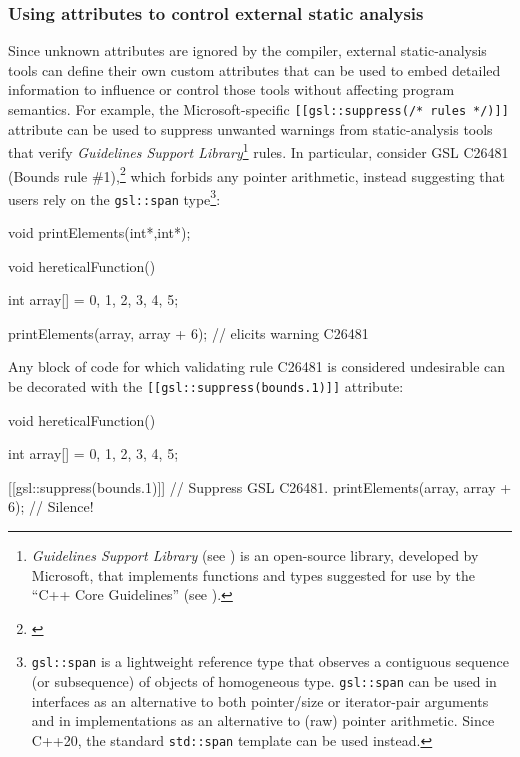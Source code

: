 \subsubsection[Using attributes to control external static analysis]{Using attributes to control external static analysis}\label{using-attributes-to-control-external-static-analysis}

Since unknown attributes are ignored by the compiler, external
static-analysis tools can define their own custom attributes that can be
used to embed detailed information to influence or control those tools
without affecting program semantics. For example, the Microsoft-specific
\lstinline![[gsl::suppress(/*!~\lstinline!rules!~\lstinline!*/)]]! attribute can
be used to suppress unwanted warnings from static-analysis tools that
verify \emph{Guidelines Support Library}{\cprotect\footnote{\emph{Guidelines
Support Library} (see \cite{microsoft}) is an open-source library, developed by Microsoft,
that implements functions and types suggested for use by the ``C++
  Core Guidelines'' (see \cite{stroustrup20}).}}
rules. In particular, consider GSL C26481 (Bounds rule \#1),\footnote{\cite{microsoftC26481}} which forbids any pointer arithmetic, instead
suggesting that users rely on the \lstinline!gsl::span!
type{\cprotect\footnote{\lstinline!gsl::span! is a lightweight reference
type that observes a contiguous sequence (or subsequence) of objects
of homogeneous type. \lstinline!gsl::span! can be used in interfaces as
an alternative to both pointer/size or iterator-pair arguments and in
implementations as an alternative to (raw) pointer arithmetic. Since
  C++20, the standard \lstinline!std::span! template can be used instead.}}:

\begin{emcppshiddenlisting}[emcppsbatch={e9,e10}]
void printElements(int*,int*);
\end{emcppshiddenlisting}
\begin{emcppslisting}[emcppsbatch=e9]
void hereticalFunction()
{
    int array[] = {0, 1, 2, 3, 4, 5};

    printElements(array, array + 6);  // elicits warning C26481
}
\end{emcppslisting}

\noindent Any block of code for which validating rule C26481 is considered
undesirable can be decorated with the
\lstinline![[gsl::suppress(bounds.1)]]! attribute:

\begin{emcppslisting}[emcppsbatch=e10,emcppserrorlines=5]
void hereticalFunction()
{
    int array[] = {0, 1, 2, 3, 4, 5};

    [[gsl::suppress(bounds.1)]]           // Suppress GSL C26481.
    {
        printElements(array, array + 6);  // Silence!
    }
}
\end{emcppslisting}



